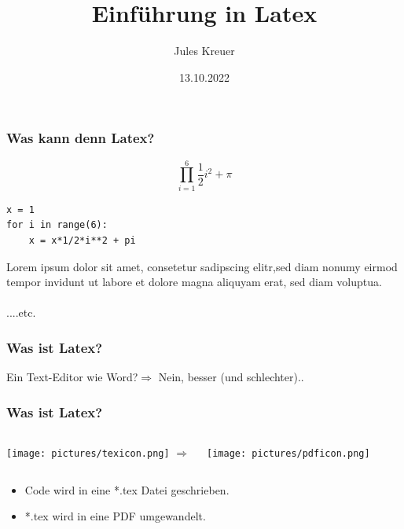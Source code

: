 \documentclass{beamer}
\title[]{Einführung in Latex} %
\author{Jules Kreuer} %
\institute[FSI] %
{
FSI Uni Tübingen\\
Mitwirkende der letzten Jahre: Andreas Rist, Tim Fischer\\
\medskip
\textit{fsi@fsi.uni-tuebingen.de}\\
\textit{contact@juleskreuer.eu}\\
}
\date{13.10.2022} %
\begin{document}
\begin{frame}
\titlepage %
\end{frame}





\begin{frame}[fragile]
\frametitle{Was kann denn Latex?}
\[
\prod^6_{i=1} \frac{1}{2}i^2 + \pi
\]
\begin{verbatim}
x = 1
for i in range(6):
    x = x*1/2*i**2 + pi
\end{verbatim}
Lorem ipsum dolor sit amet, consetetur sadipscing elitr,sed diam nonumy eirmod tempor invidunt ut labore et dolore magna aliquyam erat, sed diam voluptua.\\\\
....etc.
\end{frame}

\begin{frame}
\frametitle{Was ist Latex?}
    Ein Text-Editor wie Word?\pause $\Rightarrow$ Nein, besser (und schlechter)..

\end{frame}


\begin{frame}
     \frametitle{Was ist Latex?}
     \begin{columns}[c] %

     \texttt{[image: pictures/texicon.png]}
     \Huge{$ \Rightarrow $}

     \texttt{[image: pictures/pdficon.png]}

     \end{columns}
\begin{itemize}[<+->]
     \item Code wird in eine *.tex Datei geschrieben.
     \item *.tex wird in eine PDF umgewandelt.
\end{itemize}
\end{frame}
\end{document}
